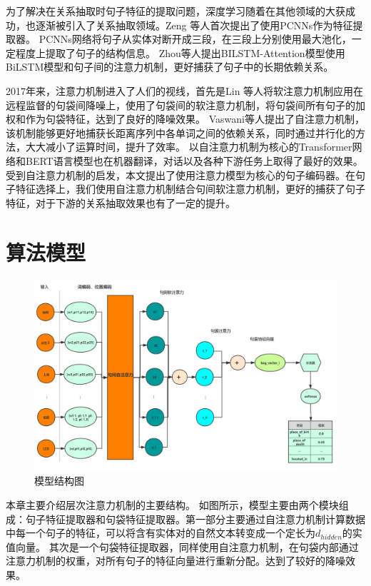 \documentclass[UTF8]{csoarticle}
\begin{document}
为了解决在关系抽取时句子特征的提取问题，深度学习随着在其他领域的大获成功，也逐渐被引入了关系抽取领域。Zeng\cite{bib3} 等人首次提出了使用PCNNs作为特征提取器。
PCNNs网络将句子从实体对断开成三段，在三段上分别使用最大池化，一定程度上提取了句子的结构信息。
Zhou\cite{bib4}等人提出BILSTM-Attention模型使用BiLSTM模型和句子间的注意力机制，更好捕获了句子中的长期依赖关系。

2017年来，注意力机制进入了人们的视线，首先是Lin \cite{bib5}等人将软注意力机制应用在远程监督的句袋间降噪上，使用了句袋间的软注意力机制，将句袋间所有句子的加权和作为句袋特征，达到了良好的降噪效果。
Vaswani\cite{bib6}等人提出了自注意力机制，该机制能够更好地捕获长距离序列中各单词之间的依赖关系，同时通过并行化的方法，大大减小了运算时间，提升了效率。
以自注意力机制为核心的Transformer网络和BERT语言模型也在机器翻译，对话以及各种下游任务上取得了最好的效果。
受到自注意力机制的启发，本文提出了使用注意力模型为核心的句子编码器。在句子特征选择上，我们使用自注意力机制结合句间软注意力机制，更好的捕获了句子特征，对于下游的关系抽取效果也有了一定的提升。
\section{算法模型}
\begin{figure}[ht]
    \centering
    \includegraphics[width=1 \textwidth]{structure.png}
    \caption{模型结构图}
    \label{fig:fig1}
    \end{figure}
本章主要介绍层次注意力机制的主要结构。
如图所示，模型主要由两个模块组成：句子特征提取器和句袋特征提取器。第一部分主要通过自注意力机制计算数据中每一个句子的特征，可以将含有实体对的自然文本转变成一个定长为$d_{hidden}$的实值向量。
其次是一个句袋特征提取器，同样使用自注意力机制，在句袋内部通过注意力机制的权重，对所有句子的特征向量进行重新分配。达到了较好的降噪效果。
\end{document}

